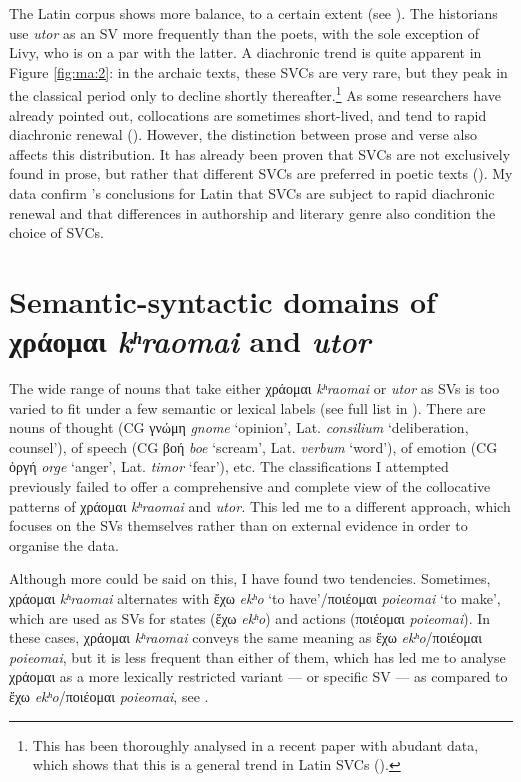 \documentclass[output=paper,colorlinks,citecolor=brown]{langscibook}
\begin{document}
The Latin corpus shows more balance, to a certain extent (see ).
The historians use \emph{utor} as an SV more frequently than the poets, with the sole exception of
Livy, who is on a par with the latter. A diachronic trend is quite apparent in Figure
\ref{fig:ma:2}: in the archaic texts, these SVCs are very rare, but they peak in the
classical period only to decline shortly thereafter.\footnote{This has been thoroughly
  analysed in a recent paper with abudant data, which shows that this is a general trend
  in Latin SVCs (\cite{banos_support_2023}).} As some researchers have already pointed
out, collocations are sometimes short-lived, and tend to rapid diachronic renewal
(\cite[48]{banos_bases_2018}). However, the distinction between prose and verse also
affects this distribution. It has already been proven that SVCs are not exclusively found
in prose, but rather that different SVCs are preferred in poetic texts
(\cite[38]{banos_bases_2018}). My data confirm \cite{banos_support_2023}'s conclusions for
Latin that SVCs are subject to rapid diachronic renewal and that differences in authorship
and literary genre also condition the choice of SVCs.

\section{Semantic-syntactic domains of χράομαι \emph{kʰraomai} and
  \emph{utor}}\label{sec:ma:6}

The wide range of nouns that take either χράομαι \emph{kʰraomai} or
\emph{utor} as SVs is too varied to fit under a few semantic or lexical labels (see full
list in \cite{madrigal_acero_dataset_2024}). There are nouns of thought (CG γνώμη
\emph{gnome} `opinion', Lat. \emph{consilium} `deliberation, counsel'), of speech (CG
βοή \emph{boe} `scream', Lat. \emph{verbum} `word'), of emotion (CG ὀργή \emph{orge}
`anger', Lat. \emph{timor} `fear'), etc. The classifications I attempted previously failed
to offer a comprehensive and complete view of the collocative patterns of χράομαι
\emph{kʰraomai} and \emph{utor.} This led me to a different approach,
which focuses on the SVs themselves rather than on external evidence in order to organise the
data.

Although more could be said on this, I have found two tendencies. Sometimes, χράομαι
\emph{kʰraomai} alternates with ἔχω \emph{ekʰo} `to
have'/ποιέομαι \emph{poieomai} `to make', which are used as SVs for states (ἔχω
\emph{ekʰo}) and actions (ποιέομαι \emph{poieomai}). In these cases,
χράομαι \emph{kʰraomai} conveys the same meaning as ἔχω
\emph{ekʰo}/ποιέομαι \emph{poieomai}, but it is less frequent than
either of them, which has led me to analyse χράομαι as a more lexically restricted variant
--- or specific SV --- as compared to ἔχω \emph{ekʰo}/ποιέομαι \emph{poieomai}, see
.
\end{document}
